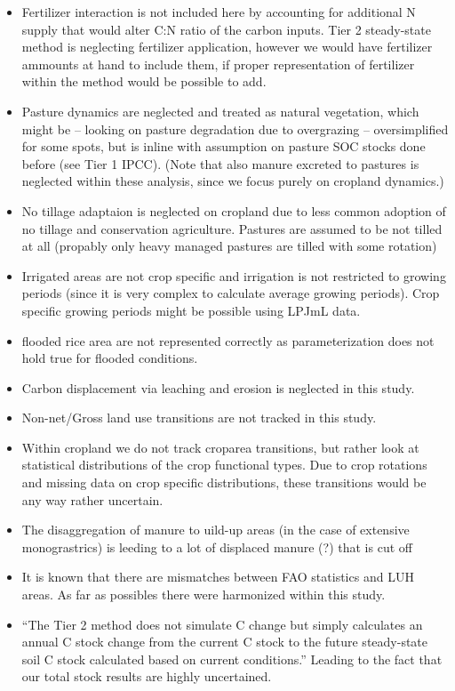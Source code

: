 \documentclass[gc, manuscript]{copernicus}
\begin{document}
\begin{itemize}
\item
  Fertilizer interaction is not included here by accounting for
  additional N supply that would alter C:N ratio of the carbon inputs.
  Tier 2 steady-state method is neglecting fertilizer application,
  however we would have fertilizer ammounts at hand to include them, if
  proper representation of fertilizer within the method would be
  possible to add.
\item
  Pasture dynamics are neglected and treated as natural vegetation,
  which might be -- looking on pasture degradation due to overgrazing --
  oversimplified for some spots, but is inline with assumption on
  pasture SOC stocks done before (see Tier 1 IPCC). (Note that also
  manure excreted to pastures is neglected within these analysis, since
  we focus purely on cropland dynamics.)
\item
  No tillage adaptaion is neglected on cropland due to less common
  adoption of no tillage and conservation agriculture. Pastures are
  assumed to be not tilled at all (propably only heavy managed pastures
  are tilled with some rotation)
\item
  Irrigated areas are not crop specific and irrigation is not restricted
  to growing periods (since it is very complex to calculate average
  growing periods). Crop specific growing periods might be possible
  using LPJmL data.
\item
  flooded rice area are not represented correctly as parameterization
  does not hold true for flooded conditions.
\item
  Carbon displacement via leaching and erosion is neglected in this
  study.
\item
  Non-net/Gross land use transitions are not tracked in this study.
\item
  Within cropland we do not track croparea transitions, but rather look
  at statistical distributions of the crop functional types. Due to crop
  rotations and missing data on crop specific distributions, these
  transitions would be any way rather uncertain.
\item
  The disaggregation of manure to uild-up areas (in the case of
  extensive monograstrics) is leeding to a lot of displaced manure (?)
  that is cut off
\item
  It is known that there are mismatches between FAO statistics and LUH
  areas. As far as possibles there were harmonized within this study.
\item
  ``The Tier 2 method does not simulate C change but simply calculates
  an annual C stock change from the current C stock to the future
  steady-state soil C stock calculated based on current conditions.''
  Leading to the fact that our total stock results are highly
  uncertained. \newpage
\end{itemize}
\end{document}
